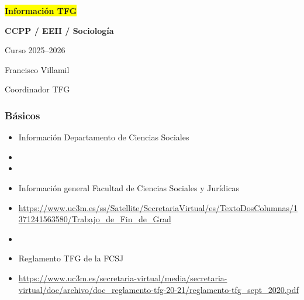 \documentclass[aspectratio=43]{beamer}
\title{}
\author{}
\date{}
\begin{document}

\begin{frame}\centering

  \colorbox{yellow}{\textbf{Información TFG}}

  \textbf{CCPP / EEII / Sociología}

  \vspace{10pt}

  Curso 2025--2026

  \vspace{20pt}
  Francisco Villamil

  Coordinador TFG

\end{frame}

\begin{frame}
\frametitle{Básicos}
\centering

\begin{itemize}
  \item Información Departamento de Ciencias Sociales
  \item[] 
  \item[]
  \item Información general Facultad de Ciencias Sociales y Jurídicas
  \item[] {\footnotesize \url{https://www.uc3m.es/ss/Satellite/SecretariaVirtual/es/TextoDosColumnas/1371241563580/Trabajo_de_Fin_de_Grad}}
  \item[]
  \item Reglamento TFG de la FCSJ
  \item[] {\footnotesize \url{https://www.uc3m.es/secretaria-virtual/media/secretaria-virtual/doc/archivo/doc_reglamento-tfg-20-21/reglamento-tfg_sept_2020.pdf}}
\end{itemize}

\end{frame}
\end{document}
